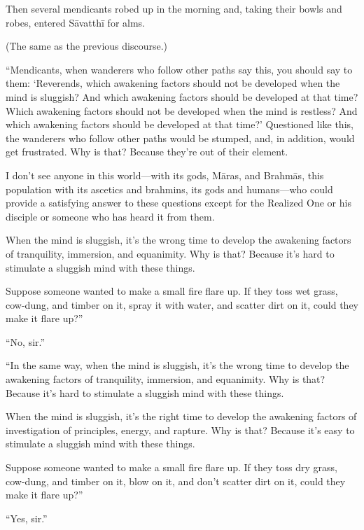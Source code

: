 \documentclass[12pt,openany]{book}%
\begin{document}
Then several mendicants robed up in the morning and, taking their bowls and robes, entered \textsanskrit{Sāvatthī} for alms. 

(The same as the previous discourse.) 

“Mendicants, when wanderers who follow other paths say this, you should say to them: ‘Reverends, which awakening factors should not be developed when the mind is sluggish? And which awakening factors should be developed at that time? Which awakening factors should not be developed when the mind is restless? And which awakening factors should be developed at that time?’ Questioned like this, the wanderers who follow other paths would be stumped, and, in addition, would get frustrated. Why is that? Because they’re out of their element. 

I don’t see anyone in this world—with its gods, \textsanskrit{Māras}, and \textsanskrit{Brahmās}, this population with its ascetics and brahmins, its gods and humans—who could provide a satisfying answer to these questions except for the Realized One or his disciple or someone who has heard it from them. 

When the mind is sluggish, it’s the wrong time to develop the awakening factors of tranquility, immersion, and equanimity. Why is that? Because it’s hard to stimulate a sluggish mind with these things. 

Suppose someone wanted to make a small fire flare up. If they toss wet grass, cow-dung, and timber on it, spray it with water, and scatter dirt on it, could they make it flare up?” 

“No, sir.” 

“In the same way, when the mind is sluggish, it’s the wrong time to develop the awakening factors of tranquility, immersion, and equanimity. Why is that? Because it’s hard to stimulate a sluggish mind with these things. 

When the mind is sluggish, it’s the right time to develop the awakening factors of investigation of principles, energy, and rapture. Why is that? Because it’s easy to stimulate a sluggish mind with these things. 

Suppose someone wanted to make a small fire flare up. If they toss dry grass, cow-dung, and timber on it, blow on it, and don’t scatter dirt on it, could they make it flare up?” 

“Yes, sir.” 
\end{document}

